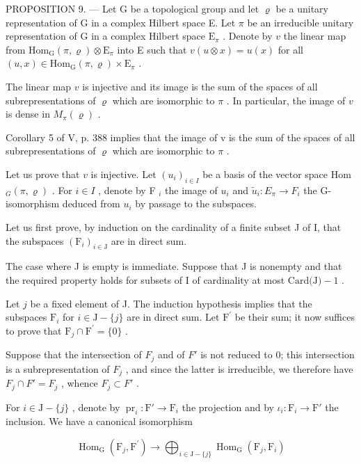 PROPOSITION 9. --- Let G be a topological group and let \(\varrho\) be a unitary representation of G in a complex Hilbert space E. Let \(\pi\) be an irreducible unitary representation of G in a complex Hilbert space \(\mathrm{E}_{\pi}\) . Denote by \(v\) the linear map from \(\mathrm{Hom}_{\mathrm{G}}(\pi, \varrho) \otimes \mathrm{E}_{\pi}\) into E such that \(v(u \otimes x) = u(x)\) for all \((u, x) \in \mathrm{Hom}_{\mathrm{G}}(\pi, \varrho) \times \mathrm{E}_{\pi}\) .

The linear map \(v\) is injective and its image is the sum of the spaces of all subrepresentations of \(\varrho\) which are isomorphic to \(\pi\) . In particular, the image of \(v\) is dense in \(M_{\pi}(\varrho)\) .

Corollary 5 of V, p. 388 implies that the image of v is the sum of the spaces of all subrepresentations of \(\varrho\) which are isomorphic to \(\pi\) .

Let us prove that \(v\) is injective. Let \((u_i)_{i \in I}\) be a basis of the vector space Hom \(_G(\pi, \varrho)\) . For \(i \in I\) , denote by F \(_i\) the image of \(u_i\) and \(\widetilde{u}_i \colon E_\pi \to F_i\) the G-isomorphism deduced from \(u_i\) by passage to the subspaces.

Let us first prove, by induction on the cardinality of a finite subset J of I, that the subspaces \((\mathrm{F}_{i})_{i\in\mathrm{J}}\) are in direct sum.

The case where J is empty is immediate. Suppose that J is nonempty and that the required property holds for subsets of I of cardinality at most \(\text{Card(J)} - 1\) .

Let \(j\) be a fixed element of J. The induction hypothesis implies that the subspaces \(\mathrm{F}_{i}\) for \(i\in\mathrm{J}-\{j\}\) are in direct sum. Let \(\mathrm{F}^{\prime}\) be their sum; it now suffices to prove that \(\mathrm{F}_{j}\cap\mathrm{F}^{\prime}=\{0\}\) .

Suppose that the intersection of \(F_{j}\) and of \(F'\) is not reduced to 0; this intersection is a subrepresentation of \(F_{j}\) , and since the latter is irreducible, we therefore have \(F_{j} \cap F' = F_{j}\) , whence \(F_{j} \subset F'\) .

For \(i \in \mathrm{J} - \{j\}\) , denote by \(\operatorname{pr}_i: \mathrm{F}' \to \mathrm{F}_i\) the projection and by \(\iota_i: \mathrm{F}_i \to \mathrm{F}'\) the inclusion. We have a canonical isomorphism

\[
\operatorname{Hom} _ {\mathrm{G}} \left(\mathrm{F} _ {j}, \mathrm{F} ^ {\prime}\right)\rightarrow \bigoplus_ {i \in \mathrm{J} - \{j \}} \operatorname{Hom} _ {\mathrm{G}} \left(\mathrm{F} _ {j}, \mathrm{F} _ {i}\right)
\]


